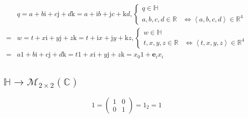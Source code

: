 \documentclass[
]{book}
\theoremstyle{definition}
\theoremstyle{definition}
\theoremstyle{definition}
\theoremstyle{definition}
\theoremstyle{remark}
\begin{document}
\[
\begin{aligned}
 & q=a+b\mathrm{i}+c\mathrm{j}+d\mathrm{k}=a+\mathrm{i}b+\mathrm{j}c+\mathrm{k}d,\begin{cases}
q\in\mathbb{H}\\
a,b,c,d\in\mathbb{R} & \Leftrightarrow\left\langle a,b,c,d\right\rangle \in\mathbb{R}^{4}
\end{cases}\\
= & w=t+x\mathrm{i}+y\mathrm{j}+z\mathrm{k}=t+\mathrm{i}x+\mathrm{j}y+\mathrm{k}z,\begin{cases}
w\in\mathbb{H}\\
t,x,y,z\in\mathbb{R} & \Leftrightarrow\left\langle t,x,y,z\right\rangle \in\mathbb{R}^{4}
\end{cases}\\
= & a1+b\mathrm{i}+c\mathrm{j}+d\mathrm{k}=t1+x\mathrm{i}+y\mathrm{j}+z\mathrm{k}=x_{{\scriptscriptstyle 0}}1+\boldsymbol{e}_{{\scriptscriptstyle i}}x_{{\scriptscriptstyle i}}
\end{aligned}
\]

\hypertarget{mathbbhrightarrowmathcalm_2times2leftmathbbcright}{%
\subsection{\texorpdfstring{\(\mathbb{H}\rightarrow\mathcal{M}_{2\times2}\left(\mathbb{C}\right)\)}{\textbackslash mathbb\{H\}\textbackslash rightarrow\textbackslash mathcal\{M\}\_\{2\textbackslash times2\}\textbackslash left(\textbackslash mathbb\{C\}\textbackslash right)}}\label{mathbbhrightarrowmathcalm_2times2leftmathbbcright}}

\[
1=\begin{pmatrix}1 & 0\\
0 & 1
\end{pmatrix}=1_{2}=1
\]
\end{document}
